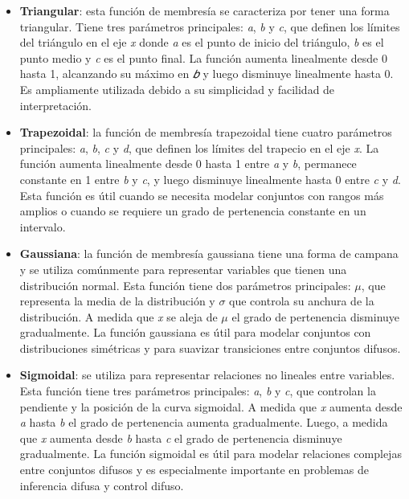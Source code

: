 \documentclass[
  a4paper,
  DIV=11,
  numbers=noendperiod]{scrreprt}
\begin{document}
\begin{itemize}
\item
  \textbf{Triangular}: esta función de membresía se caracteriza por
  tener una forma triangular. Tiene tres parámetros principales:
  \emph{a}, \emph{b} y \emph{c}, que definen los límites del triángulo
  en el eje \emph{x} donde \emph{a} es el punto de inicio del triángulo,
  \emph{b} es el punto medio y \emph{c} es el punto final. La función
  aumenta linealmente desde 0 hasta 1, alcanzando su máximo en \emph{𝑏}
  y luego disminuye linealmente hasta 0. Es ampliamente utilizada debido
  a su simplicidad y facilidad de interpretación.
\item
  \textbf{Trapezoidal}: la función de membresía trapezoidal tiene cuatro
  parámetros principales: \emph{a}, \emph{b}, \emph{c} y \emph{d}, que
  definen los límites del trapecio en el eje \emph{x}. La función
  aumenta linealmente desde 0 hasta 1 entre \emph{a} y \emph{b},
  permanece constante en 1 entre \emph{b} y \emph{c}, y luego disminuye
  linealmente hasta 0 entre \emph{c} y \emph{d}. Esta función es útil
  cuando se necesita modelar conjuntos con rangos más amplios o cuando
  se requiere un grado de pertenencia constante en un intervalo.
\item
  \textbf{Gaussiana}: la función de membresía gaussiana tiene una forma
  de campana y se utiliza comúnmente para representar variables que
  tienen una distribución normal. Esta función tiene dos parámetros
  principales: \(\mu\), que representa la media de la distribución y
  \(\sigma\) que controla su anchura de la distribución. A medida que
  \emph{x} se aleja de \(\mu\) el grado de pertenencia disminuye
  gradualmente. La función gaussiana es útil para modelar conjuntos con
  distribuciones simétricas y para suavizar transiciones entre conjuntos
  difusos.
\item
  \textbf{Sigmoidal}: se utiliza para representar relaciones no lineales
  entre variables. Esta función tiene tres parámetros principales:
  \emph{a}, \emph{b} y \emph{c}, que controlan la pendiente y la
  posición de la curva sigmoidal. A medida que \emph{x} aumenta desde
  \emph{a} hasta \emph{b} el grado de pertenencia aumenta gradualmente.
  Luego, a medida que \emph{x} aumenta desde \emph{b} hasta \emph{c} el
  grado de pertenencia disminuye gradualmente. La función sigmoidal es
  útil para modelar relaciones complejas entre conjuntos difusos y es
  especialmente importante en problemas de inferencia difusa y control
  difuso.
\end{itemize}
\end{document}
